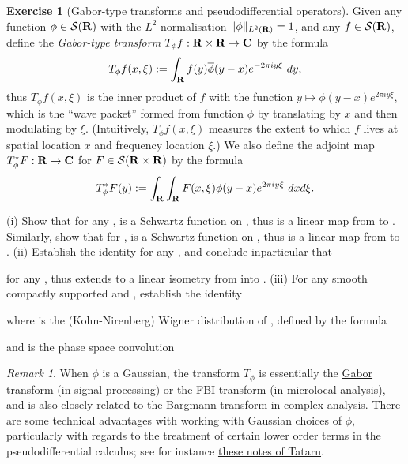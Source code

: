 \documentclass[11pt]{article}
\theoremstyle{definition}
\newtheorem{exercise}[theorem]{Exercise}
\theoremstyle{remark}
\newtheorem{remark}[theorem]{Remark}
\begin{document}
\begin{exercise}[Gabor-type transforms and pseudodifferential operators]
 \label{gabor} Given any function \({\phi \in {\mathcal S}({\bf R})}\) with the \({L^2}\) normalisation \({\|\phi\|_{L^2({\bf R})}=1}\), and any \({f \in {\mathcal S}({\bf R})}\), define the \emph{Gabor-type transform} \({T_\phi f: {\bf R} \times {\bf R} \rightarrow {\bf C}}\) by the formula 
\[\displaystyle  T_\phi f(x,\xi) := \int_{\bf R} f(y) \overline{\phi}(y-x) e^{-2\pi i y \xi}\ dy,\]
 thus \({T_\phi f(x,\xi)}\) is the inner product of \({f}\) with the function \({y \mapsto \phi(y-x) e^{2\pi i y \xi}}\), which is the “wave packet” formed from function \({\phi}\) by translating by \({x}\) and then modulating by \({\xi}\). (Intuitively, \({T_\phi f(x,\xi)}\) measures the extent to which \({f}\) lives at spatial location \({x}\) and frequency location \({\xi}\).) We also define the adjoint map \({T_\phi^* F: {\bf R} \rightarrow {\bf C}}\) for \({F \in {\mathcal S}({\bf R} \times {\bf R})}\) by the formula 
\[\displaystyle  T_\phi^* F(y) := \int_{\bf R} \int_{\bf R} F(x,\xi) \phi(y-x) e^{2\pi i y \xi}\ dx d\xi.\]

(i) Show that for any ,  is a Schwartz function on , thus  is a linear map from  to . Similarly, show that for ,  is a Schwartz function on , thus  is a linear map from  to . 
(ii) Establish the identity  for any , and conclude inparticular that

 for any , thus  extends to a linear isometry from  into . 
(iii) For any smooth compactly supported  and , establish the identity

 where  is the (Kohn-Nirenberg) Wigner distribution of , defined by the formula 

 and  is the phase space convolution 




\end{exercise}
\begin{remark}
  When \({\phi}\) is a Gaussian, the transform \({T_\phi}\) is essentially the \href{https://en.wikipedia.org/wiki/Gabor_transform}{Gabor transform} (in signal processing) or the \href{https://en.wikipedia.org/wiki/Fourier%E2%80%93Bros%E2%80%93Iagolnitzer_transform}{FBI transform} (in microlocal analysis), and is also closely related to the \href{https://en.wikipedia.org/wiki/Segal%E2%80%93Bargmann_space#The_Segal%E2%80%93Bargmann_transform}{Bargmann transform} in complex analysis. There are some technical advantages with working with Gaussian choices of \({\phi}\), particularly with regards to the treatment of certain lower order terms in the pseudodifferential calculus; see for instance \href{https://math.berkeley.edu/~tataru/papers/phasespace.pdf}{these notes of Tataru}. 
\end{remark}
\end{document}
